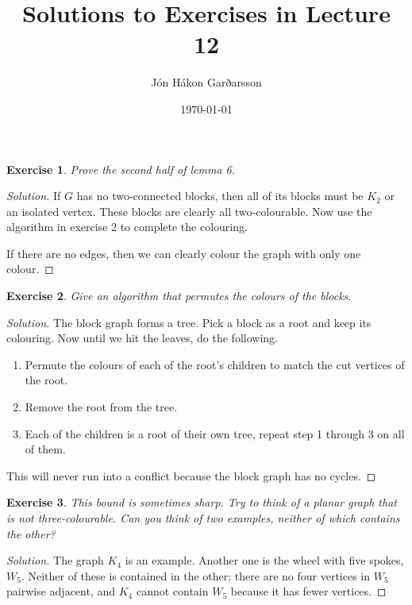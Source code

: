 \documentclass[a4paper]{article}
\title{Solutions to Exercises in Lecture 12}
\author{Jón Hákon Garðarsson}
\date{\today}
\newtheorem{exercise}{Exercise}
\newenvironment{solution}{\begin{proof}[Solution]\renewcommand{\qedsymbol}{}\ignorespaces}{\end{proof}}
\begin{document}
\maketitle

\begin{exercise}
Prove the second half of lemma 6.
\end{exercise}

\begin{solution}
If \(G\) has no two-connected blocks, then all of its blocks must be \(K_2\) or an isolated vertex.
These blocks are clearly all two-colourable.
Now use the algorithm in exercise 2 to complete the colouring.

If there are no edges, then we can clearly colour the graph with only one colour.
\end{solution}

\begin{exercise}
Give an algorithm that permutes the colours of the blocks.
\end{exercise}

\begin{solution}
The block graph forms a tree.
Pick a block as a root and keep its colouring.
Now until we hit the leaves, do the following.
\begin{enumerate}
	\item Permute the colours of each of the root's children to match the cut vertices of the root.
	\item Remove the root from the tree.
	\item Each of the children is a root of their own tree, repeat step 1 through 3 on all of them.
\end{enumerate}
This will never run into a conflict because the block graph has no cycles.
\end{solution}

\begin{exercise}
This bound is sometimes sharp.
Try to think of a planar graph that is not three-colourable.
Can you think of two examples, neither of which contains the other?
\end{exercise}

\begin{solution}
The graph \(K_4\) is an example.
Another one is the wheel with five spokes, \(W_5\).
Neither of these is contained in the other; there are no four vertices in \(W_5\) pairwise adjacent, and \(K_4\) cannot contain \(W_5\) because it has fewer vertices.
\end{solution}
\end{document}
